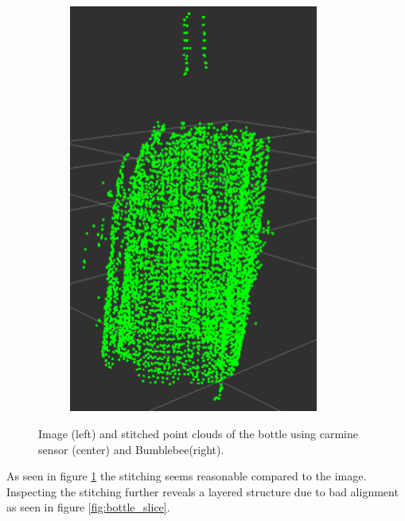 \begin{figure}[htb]
\begin{subfigure}[b]{0.3\textwidth}
\begin{center}
			\includegraphics[width=0.9\textwidth]{graphics/07_modelling/bottle_bumbee.png}
			\end{center}
        \end{subfigure}  
		\caption{Image (left) and stitched point clouds of the bottle using carmine sensor (center) and Bumblebee(right).}\label{fig:bottle}
\end{figure}

\noindent As seen in figure \ref{fig:bottle} the stitching seems reasonable compared to the image. Inspecting the stitching further reveals a layered structure due to bad alignment as seen in figure \ref{fig:bottle_slice}.

